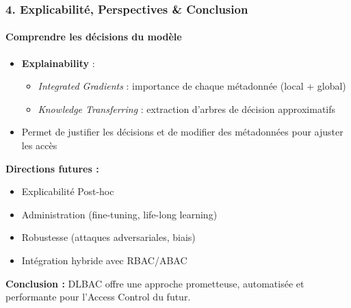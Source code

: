 \documentclass{beamer}
\begin{document}
\begin{frame}
\frametitle{4. Explicabilité, Perspectives \& Conclusion}
\framesubtitle{Comprendre les décisions du modèle}

\begin{itemize}
    \item \textbf{Explainability} :
    \begin{itemize}
        \item \textit{Integrated Gradients} : importance de chaque métadonnée (local + global)
        \item \textit{Knowledge Transferring} : extraction d'arbres de décision approximatifs
    \end{itemize}
    \item Permet de justifier les décisions et de modifier des métadonnées pour ajuster les accès
\end{itemize}

\vspace{0.3cm}
\textbf{Directions futures :}
\begin{itemize}
    \item Explicabilité Post-hoc
    \item Administration (fine-tuning, life-long learning)
    \item Robustesse (attaques adversariales, biais)
    \item Intégration hybride avec RBAC/ABAC
\end{itemize}

\begin{center}
\textbf{Conclusion :} DLBAC offre une approche prometteuse, automatisée et performante pour l'Access Control du futur.
\end{center}

\end{frame}
\end{document}
